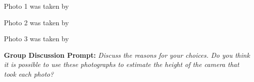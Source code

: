 \documentclass{ximera}
\begin{document}
\begin{exploration}
Photo 1 was taken by 
\begin{multipleChoice}
\end{multipleChoice}

Photo 2 was taken by 
\begin{multipleChoice}
\end{multipleChoice}

Photo 3 was taken by 
\begin{multipleChoice}
\end{multipleChoice}

\textbf{Group Discussion Prompt:}
\emph{Discuss the reasons for your choices.  Do you think it is possible to use these photographs to estimate the height of the camera that took each photo?}
\end{exploration}
\end{document}
